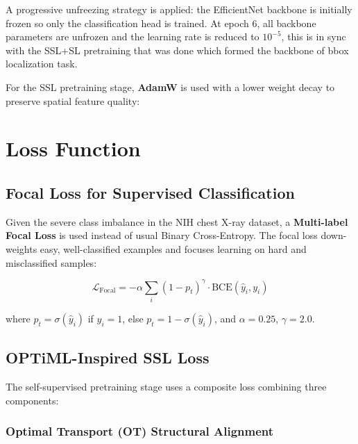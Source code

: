 A progressive unfreezing strategy is applied: the EfficientNet backbone is initially frozen so only the classification head is trained. At epoch 6, all backbone parameters are unfrozen and the learning rate is reduced to $10^{-5}$, this is in sync with the SSL+SL pretraining that was done which formed the backbone of bbox localization task.

For the SSL pretraining stage, \textbf{AdamW} is used with a lower weight decay to preserve spatial feature quality:

\section{Loss Function}

\subsection{Focal Loss for Supervised Classification}

Given the severe class imbalance in the NIH chest X-ray dataset, a \textbf{Multi-label Focal Loss} is used instead of usual Binary Cross-Entropy. The focal loss down-weights easy, well-classified examples and focuses learning on hard and misclassified samples:

\begin{equation}
\mathcal{L}_{\text{Focal}} = -\alpha \sum_{i} (1 - p_t)^{\gamma} \cdot \text{BCE}(\hat{y}_i, y_i)
\end{equation}

where $p_t = \sigma(\hat{y}_i)$ if $y_i = 1$, else $p_t = 1 - \sigma(\hat{y}_i)$, and $\alpha = 0.25$, $\gamma = 2.0$.

\subsection{OPTiML-Inspired SSL Loss}

The self-supervised pretraining stage uses a composite loss combining three components:

\subsubsection{Optimal Transport (OT) Structural Alignment~\cite{otcxr}}

